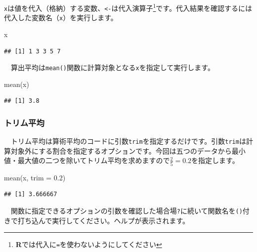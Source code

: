 \documentclass[
  12pt,
]{book}
\newenvironment{Shaded}{\begin{snugshade}}{\end{snugshade}}
\newcommand{\AttributeTok}[1]{\textcolor[rgb]{0.77,0.63,0.00}{#1}}
\newcommand{\FloatTok}[1]{\textcolor[rgb]{0.00,0.00,0.81}{#1}}
\newcommand{\FunctionTok}[1]{\textcolor[rgb]{0.00,0.00,0.00}{#1}}
\newcommand{\NormalTok}[1]{#1}
\begin{document}
\texttt{x}は値を代入（格納）する変数、\texttt{\textless{}-}は代入演算子\footnote{\textbf{R}では代入に\texttt{=}を使わないようにしてください}です。代入結果を確認するには代入した変数名（\texttt{x}）を実行します。

\begin{Shaded}
\begin{Highlighting}[numbers=left,,]
\NormalTok{x}
\end{Highlighting}
\end{Shaded}

\begin{verbatim}
## [1] 1 3 3 5 7
\end{verbatim}

　算出平均は\texttt{mean()}関数に計算対象となる\texttt{x}を指定して実行します。

\begin{Shaded}
\begin{Highlighting}[numbers=left,,]
\FunctionTok{mean}\NormalTok{(x)}
\end{Highlighting}
\end{Shaded}

\begin{verbatim}
## [1] 3.8
\end{verbatim}

\hypertarget{ux30c8ux30eaux30e0ux5e73ux5747}{%
\subsubsection*{トリム平均}\label{ux30c8ux30eaux30e0ux5e73ux5747}}

　トリム平均は算術平均のコードに引数\texttt{trim}を指定するだけです。引数\texttt{trim}は計算対象外にする割合を指定するオプションです。今回は五つのデータから最小値・最大値の二つを除いてトリム平均を求めますので\(\frac{2}{5} = 0.2\)を指定します。

\begin{Shaded}
\begin{Highlighting}[numbers=left,,]
\FunctionTok{mean}\NormalTok{(x, }\AttributeTok{trim =} \FloatTok{0.2}\NormalTok{)}
\end{Highlighting}
\end{Shaded}

\begin{verbatim}
## [1] 3.666667
\end{verbatim}

　関数に指定できるオプションの引数を確認した場合場\texttt{?}に続いて関数名を\texttt{()}付きで打ち込んで実行してください。ヘルプが表示されます。
\end{document}

